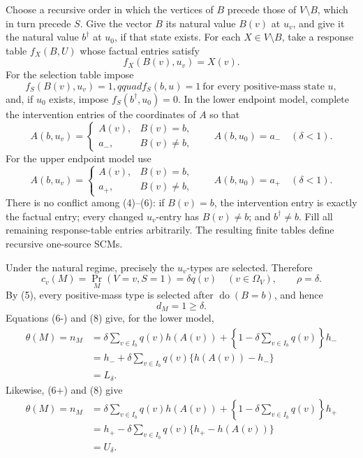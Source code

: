 Choose a recursive order in which the vertices of \(B\) precede those of \(V\setminus B\), which in turn precede \(S\).  Give the vector \(B\) its natural value \(B(v)\) at \(u_v\), and give it the natural value \(b^\dagger\) at \(u_0\), if that state exists.  For each \(X\in V\setminus B\), take a response table \(f_X(B,U)\) whose factual entries satisfy
\[
f_X(B(v),u_v)=X(v). \tag{4}
\]
For the selection table impose
\[
f_S(B(v),u_v)=1,qquad
f_S(b,u)=1\ \text{for every positive-mass state }u, \tag{5}
\]
and, if \(u_0\) exists, impose \(f_S(b^\dagger,u_0)=0\).  In the lower endpoint model, complete the intervention entries of the coordinates of \(A\) so that
\[
A(b,u_v)=
\begin{cases}
A(v),&B(v)=b,\\
a_-,&B(v)\neq b,
\end{cases}
\qquad
A(b,u_0)=a_-\quad(\delta<1). \tag{6-}
\]
For the upper endpoint model use
\[
A(b,u_v)=
\begin{cases}
A(v),&B(v)=b,\\
a_+,&B(v)\neq b,
\end{cases}
\qquad
A(b,u_0)=a_+\quad(\delta<1). \tag{6+}
\]
There is no conflict among (4)--(6): if \(B(v)=b\), the intervention entry is exactly the factual entry; every changed \(u_v\)-entry has \(B(v)\neq b\); and \(b^\dagger\neq b\).  Fill all remaining response-table entries arbitrarily.  The resulting finite tables define recursive one-source SCMs.

Under the natural regime, precisely the \(u_v\)-types are selected.  Therefore
\[
c_v(M)=\Pr_M(V=v,S=1)=\delta q(v)\quad(v\in\Omega_V),
\qquad \rho=\delta. \tag{7}
\]
By (5), every positive-mass type is selected after \(\operatorname{do}(B=b)\), and hence
\[
d_M=1\geq\delta. \tag{8}
\]
Equations (6-) and (8) give, for the lower model,
\[
\begin{aligned}
\theta(M)
=n_M
&=\delta\sum_{v\in I_b}q(v)h(A(v))
+\left\{1-\delta\sum_{v\in I_b}q(v)\right\}h_-\\
&=h_-+\delta\sum_{v\in I_b}q(v)\{h(A(v))-h_-\}\\
&=L_\delta.
\end{aligned} \tag{9-}
\]
Likewise, (6+) and (8) give
\[
\begin{aligned}
\theta(M)
=n_M
&=\delta\sum_{v\in I_b}q(v)h(A(v))
+\left\{1-\delta\sum_{v\in I_b}q(v)\right\}h_+\\
&=h_+-\delta\sum_{v\in I_b}q(v)\{h_+-h(A(v))\}\\
&=U_\delta.
\end{aligned} \tag{9+}
\]

